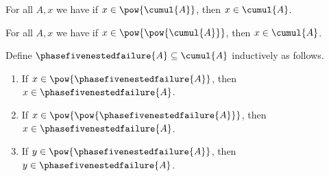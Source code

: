 \begin{axiom}\label{phase5_nested_failure_guard_1}
    For all $A, x$ we have if $x\in\pow{\cumul{A}}$, then
        $x\in\cumul{A}$.
\end{axiom}

\begin{axiom}\label{phase5_nested_failure_guard_2}
    For all $A, x$ we have if $x\in\pow{\pow{\cumul{A}}}$, then
        $x\in\cumul{A}$.
\end{axiom}

\begin{inductive}\label{phase5_nested_failure}
    Define $\phasefivenestedfailure{A}\subseteq\cumul{A}$ inductively as follows.
    \begin{enumerate}
        \item If $x\in\pow{\phasefivenestedfailure{A}}$, then
            $x\in\phasefivenestedfailure{A}$.
        \item If $x\in\pow{\pow{\phasefivenestedfailure{A}}}$, then
            $x\in\phasefivenestedfailure{A}$.
        \item If $y\in\pow{\phasefivenestedfailure{A}}$, then
            $y\in\phasefivenestedfailure{A}$.
    \end{enumerate}
\end{inductive}
